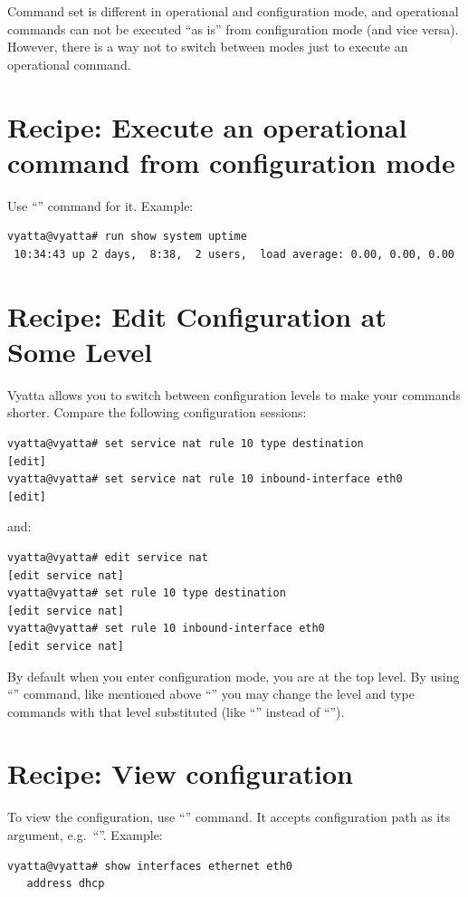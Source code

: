Command set is different in operational and configuration mode, and operational commands can not be executed
``as is'' from configuration mode (and vice versa). However, there is a way not to switch between modes just to
execute an operational command.

\section{Recipe: Execute an operational command from configuration mode}
\solution
Use ``'' command for it. Example:
\begin{verbatim}
vyatta@vyatta# run show system uptime 
 10:34:43 up 2 days,  8:38,  2 users,  load average: 0.00, 0.00, 0.00
\end{verbatim}

\section{Recipe: Edit Configuration at Some Level}
\solution
Vyatta allows you to switch between configuration levels to make your commands shorter. Compare the following
configuration sessions:
\begin{verbatim}
vyatta@vyatta# set service nat rule 10 type destination 
[edit]
vyatta@vyatta# set service nat rule 10 inbound-interface eth0
[edit]
\end{verbatim}
and:
\begin{verbatim}
vyatta@vyatta# edit service nat 
[edit service nat]
vyatta@vyatta# set rule 10 type destination 
[edit service nat]
vyatta@vyatta# set rule 10 inbound-interface eth0
[edit service nat]
\end{verbatim}
By default when you enter configuration mode, you are at the top level. By using ``'' command,
like mentioned above ``'' you may change the level and type commands with that level
substituted (like ``'' instead of 
``'').

\section{Recipe: View configuration}
\solution
To view the configuration, use ``'' command. It accepts configuration path as its argument, 
e.g.~``''. Example:
\begin{verbatim}
vyatta@vyatta# show interfaces ethernet eth0
   address dhcp
\end{verbatim}

